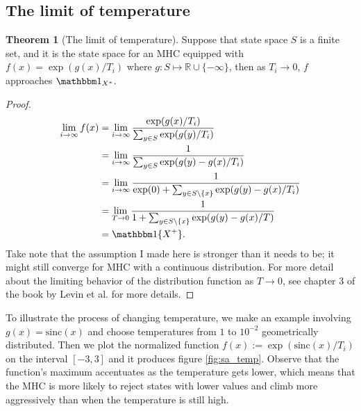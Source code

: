 \documentclass[]{article}
\theoremstyle{definition}
\newtheorem{theorem}{Theorem}       %
\begin{document}
    \subsection{The limit of temperature}
        \begin{theorem}[The limit of temperature]
            Suppose that state space $S$ is a finite set, and it is the state space for an MHC equipped with $f(x) = \exp(g(x)/T_i)$ where $g:S \mapsto \mathbb R \cup \{-\infty\}$, then as $T_i\rightarrow 0$, $f$ approaches $\mathbbm 1_{X^*}$. 
        \end{theorem}
        \begin{proof}
            \begin{align*}
                \lim_{i\rightarrow \infty}f(x) 
                &= 
                \lim_{i\rightarrow \infty} \frac{\exp(g(x)/T_i)}
                {
                    \sum_{y\in S}^{}
                    \exp(g(y)/T_i)
                }
                \\
                &= 
                \lim_{i\rightarrow \infty}
                \frac{1}{\sum_{y\in S}^{}\exp(g(y) - g(x)/T_i)}
                \\
                &= 
                \lim_{i\rightarrow \infty}
                \frac{1}{\exp(0) + \sum_{y\in S\setminus\{x\}}^{}\exp(g(y) - g(x)/T_i)}
                \\
                &= 
                \lim_{T\rightarrow 0}
                \frac{1}{1 + \sum_{y\in S\setminus\{x\}}^{}\exp(g(y) - g(x)/T)}
                \\
                &= \mathbbm 1\{X^+\}. 
            \end{align*}
            Take note that the assumption I made here is stronger than it needs to be; it might still converge for MHC with a continuous distribution. For more detail about the limiting behavior of the distribution function as $T\rightarrow 0$, see chapter 3 of the book by Levin et al. \cite {book:mkv_mix_time} for more details. 
        \end{proof}
        To illustrate the process of changing temperature, we make an example involving $g(x) = \text{sinc}(x)$ and choose temperatures from $1$ to $10^{-2}$ geometrically distributed. Then we plot the normalized function $f(x):= \exp(\text{sinc}(x)/T_i)$ on the interval $[-3, 3]$ and it produces figure \ref*{fig:sa_temp}. Observe that the function's maximum accentuates as the temperature gets lower, which means that the MHC is more likely to reject states with lower values and climb more aggressively than when the temperature is still high. 
\end{document}
